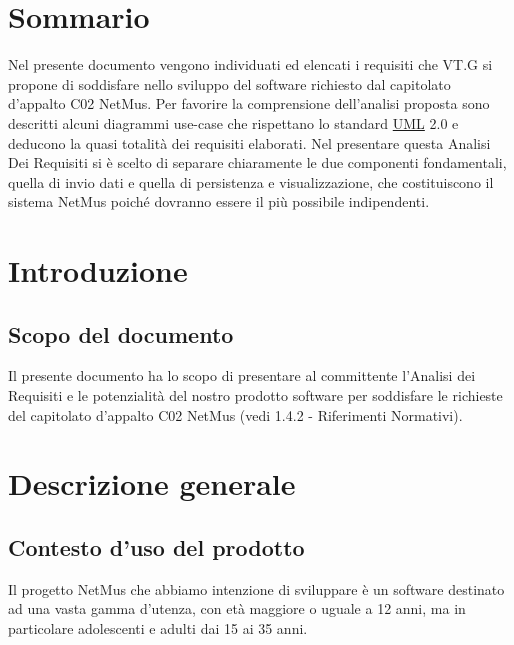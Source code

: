 \tableofcontents

\chapter*{Sommario}
Nel presente documento vengono individuati ed elencati i requisiti che VT.G si
propone di soddisfare nello sviluppo del software richiesto dal capitolato
d'appalto C02 NetMus. Per favorire la comprensione dell'analisi proposta sono
descritti alcuni diagrammi use-case che rispettano lo standard \underline{UML}
2.0 e deducono la quasi totalit\`a dei requisiti elaborati.
Nel presentare questa Analisi Dei Requisiti si \`e scelto di separare
chiaramente le due componenti fondamentali, quella di invio dati e quella di persistenza e
visualizzazione, che costituiscono il sistema NetMus poich\'e dovranno essere il
pi\`u possibile indipendenti.

\thispagestyle{fancy} %

\chapter{Introduzione}
\thispagestyle{fancy} %

\section{Scopo del documento}
Il presente documento ha lo scopo di presentare al committente l'Analisi dei
Requisiti e le potenzialit\`a del nostro prodotto software per soddisfare le
richieste del capitolato d'appalto C02 NetMus (vedi 1.4.2 - Riferimenti
Normativi).



\chapter{Descrizione generale}
\thispagestyle{fancy}

\section{Contesto d'uso del prodotto}
Il progetto NetMus che abbiamo intenzione di sviluppare \`e un software
destinato ad una vasta gamma d'utenza, con et\`a maggiore o uguale
a 12 anni, ma in particolare adolescenti e adulti dai 15 ai 35 anni.

